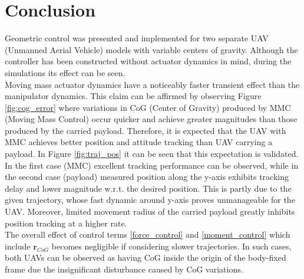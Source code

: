 \section{Conclusion} \label{sec:conclusion}
Geometric control was presented and implemented for two separate UAV (Unmanned Aerial Vehicle) models with variable centers of gravity. Although the controller has been constructed without actuator dynamics in mind, during the simulations its effect can be seen. \\
Moving mass actuator dynamics have a noticeably faster transient effect than the manipulator dynamics. This claim can be affirmed by observing Figure \ref{fig:cog_error} where variations in CoG (Center of Gravity) produced by MMC (Moving Mass Control) occur quicker and achieve greater magnitudes than those produced by the carried payload. Therefore, it is expected that the UAV with MMC achieves better position and attitude tracking than UAV carrying a payload. In Figure \ref{fig:traj_pos} it can be seen that this expectation is validated. \\
In the first case (MMC) excellent tracking performance can be observed, while in the second case (payload) measured position along the y-axis exhibits tracking delay and lower magnitude w.r.t. the desired position. This is partly due to the given trajectory, whose fast dynamic around y-axis proves unmanageable for the UAV. Moreover, limited movement radius of the carried payload greatly inhibits position tracking at a higher rate.   \\
The overall effect of control terms \eqref{force_control} and \eqref{moment_control} which include $\textbf{r}_{CoG}$ becomes negligible if considering slower trajectories. In such cases, both UAVs can be observed as having CoG inside the origin of the body-fixed frame due the insignificant disturbance caused by CoG variations. 
